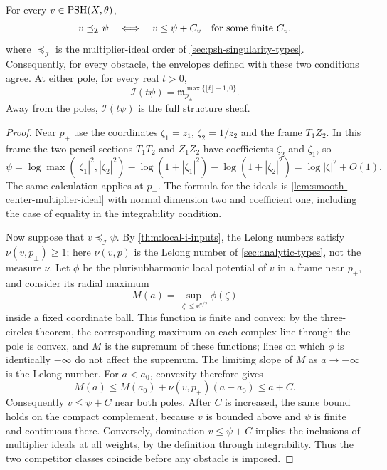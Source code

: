 \begin{lemma}\label{lem:pencil-ideal-ordinary-class}
For every $v\in\mathrm{PSH}(X,\theta)$,
\[
 v\preceq_{\mathcal I}\psi
 \quad\Longleftrightarrow\quad v\leq\psi+C_v
 \quad\hbox{for some finite }C_v,
\]
where $\preceq_{\mathcal I}$ is the multiplier-ideal order of \cref{sec:psh-singularity-types}. Consequently, for every obstacle, the envelopes defined with these two conditions agree. At either pole, for every real $t>0$,
\[
 \mathcal I(t\psi)=\mathfrak m_{p_\pm}^{\max\{\lfloor t\rfloor-1,0\}}.
\]
Away from the poles, $\mathcal I(t\psi)$ is the full structure sheaf.
\end{lemma}
\begin{proof}
Near $p_+$ use the coordinates $\zeta_1=z_1$, $\zeta_2=1/z_2$ and the frame $T_1Z_2$. In this frame the two pencil sections $T_1T_2$ and $Z_1Z_2$ have coefficients $\zeta_2$ and $\zeta_1$, so
\[
 \psi=\log\max(|\zeta_1|^2,|\zeta_2|^2)
       -\log(1+|\zeta_1|^2)-\log(1+|\zeta_2|^2)
      =\log|\zeta|^2+O(1).
\]
The same calculation applies at $p_-$. The formula for the ideals is \cref{lem:smooth-center-multiplier-ideal} with normal dimension two and coefficient one, including the case of equality in the integrability condition.

Now suppose that $v\preceq_{\mathcal I}\psi$. By \cref{thm:local-i-inputs}, the Lelong numbers satisfy $\nu(v,p_\pm)\geq1$; here $\nu(v,p)$ is the Lelong number of \cref{sec:analytic-types}, not the measure $\nu$. Let $\phi$ be the plurisubharmonic local potential of $v$ in a frame near $p_\pm$, and consider its radial maximum
\[
 M(a)=\sup_{|\zeta|\leq \mathrm e^{a/2}}\phi(\zeta)
\]
inside a fixed coordinate ball. This function is finite and convex: by the three-circles theorem, the corresponding maximum on each complex line through the pole is convex, and $M$ is the supremum of these functions; lines on which $\phi$ is identically $-\infty$ do not affect the supremum. The limiting slope of $M$ as $a\to-\infty$ is the Lelong number. For $a<a_0$, convexity therefore gives
\[
 M(a)\leq M(a_0)+\nu(v,p_\pm)(a-a_0)\leq a+C.
\]
Consequently $v\leq\psi+C$ near both poles. After $C$ is increased, the same bound holds on the compact complement, because $v$ is bounded above and $\psi$ is finite and continuous there. Conversely, domination $v\leq\psi+C$ implies the inclusions of multiplier ideals at all weights, by the definition through integrability. Thus the two competitor classes coincide before any obstacle is imposed.
\end{proof}

